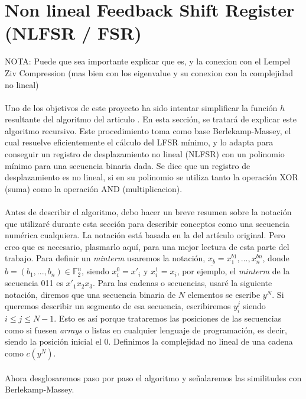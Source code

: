 \section{Non lineal Feedback Shift Register (NLFSR / FSR)}
NOTA: Puede que sea importante explicar que es, y la conexion con el Lempel Ziv Compression (mas bien con los eigenvalue y su conexion con la complejidad no lineal)\\\\
Uno de los objetivos de este proyecto ha sido intentar simplificar la función $h$ resultante del algoritmo del articulo \cite{limniotis2007nonlinear}. En esta sección, se tratará de explicar este algoritmo recursivo. Este procedimiento toma como base Berlekamp-Massey, el cual resuelve eficientemente el cálculo del LFSR mínimo, y lo adapta para conseguir un registro de desplazamiento no lineal (NLFSR) con un 
polinomio mínimo para una secuencia binaria dada. Se dice que un registro de desplazamiento es no lineal, si en su polinomio se utiliza tanto la operación XOR (suma) como la operación AND (multiplicacion).\\\\
Antes de describir el algoritmo, debo hacer un breve resumen sobre la notación que utilizaré durante esta sección para describir conceptos como una secuencia numérica cualquiera. La notación está basada en la del artículo original. Pero creo que es necesario, plasmarlo aquí, para una mejor lectura de esta parte del trabajo. Para definir un \textit{minterm} usaremos la notación, $\underline{x_b} = x_1^{b1} ,..., x_n^{bn}$, donde $b = (b_1,...,b_n) \in \mathbb{F}_2^{n}$, siendo $x_i^0 = x'_i$ y $x_i^1 = x_i$, por ejemplo, el \textit{minterm} de la secuencia 011 es $x'_1x_2x_3$. Para las cadenas o secuencias, usaré la siguiente notación, diremos que una secuencia binaria de $N$ elementos se escribe $y^{N}$. Si queremos describir un segmento de esa secuencia, escribiremos $y_{i}^{j}$ siendo $i\leq j \leq N-1$. Esto es así porque trataremos las posiciones de las secuencias como si fuesen \textit{arrays} o listas en cualquier lenguaje de programación, es decir, siendo la posición inicial el 0. Definimos la complejidad no lineal de una cadena como $c(y^{N})$. \\\\%
Ahora desglosaremos paso por paso el algoritmo y señalaremos las similitudes con Berlekamp-Massey.

